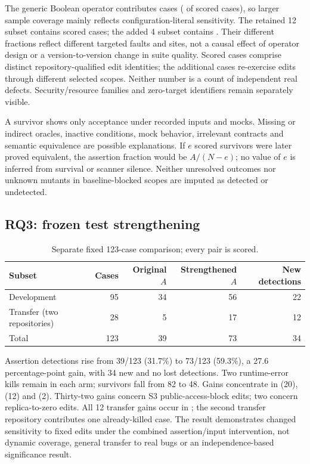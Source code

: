 


\FloatBarrier

The generic Boolean operator contributes \BooleanScored{} cases (\BooleanShare{} of scored cases), so larger sample coverage mainly reflects configuration-literal sensitivity. The retained 12 subset contains \LegacyScored{} scored cases; the added 4 subset contains \NewScored{}. Their different fractions reflect different targeted faults and sites, not a causal effect of operator design or a version-to-version change in suite quality. Scored cases comprise \DistinctScoredEdits{} distinct repository-qualified edit identities; the additional cases re-exercise edits through different selected scopes. Neither number is a count of independent real defects. Security/resource families and zero-target identifiers remain separately visible.




A survivor shows only acceptance under recorded inputs and mocks. Missing or indirect oracles, inactive conditions, mock behavior, irrelevant contracts and semantic equivalence are possible explanations. If $e$ scored survivors were later proved equivalent, the assertion fraction would be $A/(N-e)$; no value of $e$ is inferred from survival or scanner silence. Neither unresolved outcomes nor unknown mutants in baseline-blocked scopes are imputed as detected or undetected.

\subsection{RQ3: frozen test strengthening}\label{sec:pairedresults}
\begin{table}[ht]
\caption{Separate fixed 123-case comparison; every pair is scored.}\label{tab:paired}
\small\begin{tabularx}{\linewidth}{@{}Xrrrr@{}}\toprule
Subset & Cases & Original $A$ & Strengthened $A$ & New detections\\\midrule
Development &95&34&56&22\\
Transfer (two repositories)&28&5&17&12\\\midrule
Total&123&39&73&34\\\bottomrule
\end{tabularx}\end{table}

Assertion detections rise from 39/123 (31.7\%) to 73/123 (59.3\%), a 27.6 percentage-point gain, with 34 new and no lost detections. Two runtime-error kills remain in each arm; survivors fall from 82 to 48. Gains concentrate in  (20),  (12) and  (2). Thirty-two gains concern S3 public-access-block edits; two concern replica-to-zero edits. All 12 transfer gains occur in ; the second transfer repository contributes one already-killed case. The result demonstrates changed sensitivity to fixed edits under the combined assertion/input intervention, not dynamic coverage, general transfer to real bugs or an independence-based significance result.

